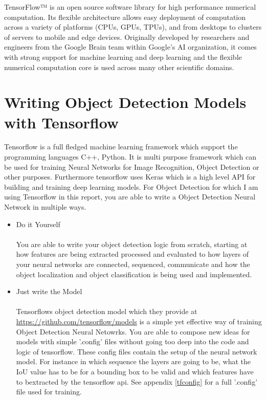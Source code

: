 
TensorFlow™ is an open source software library for high performance numerical computation. Its flexible architecture allows easy deployment
of computation across a variety of platforms (CPUs, GPUs, TPUs), and from desktops to clusters of servers to mobile and edge devices.
Originally developed by researchers and engineers from the Google Brain team within Google’s AI organization, it comes with strong support
for machine learning and deep learning and the flexible numerical computation core is used across many other scientific
domains.\cite{tensorflow}

\section{Writing Object Detection Models with Tensorflow} \label{train with tensorflow}
Tensorflow is a full fledged machine learning framework which support the programming languages C++, Python. It is multi purpose framework
which can be used for training Neural Networks for Image Recognition, Object Detection or other purposes. Furthermore tensorflow uses
Keras which is a high level API for building and training deep learning models. For Object Detection for which I am using Tensorflow in this
report, you are able to write a Object Detection Neural Network in multiple ways.
\begin{itemize}
    \item Do it Yourself \\ \\
        You are able to write your object detection logic from scratch, starting at how features are being extracted processed and
        evaluated to how layers of your neural networks are connected, sequenced, communicate and how the object localization and object
        classification is being used and implemented.
    \item Just write the Model \\ \\
        Tensorflows object detection model which they provide at \url{https://github.com/tensorflow/models} is a simple yet effective way of
        training Object Detection Neural Netowrks. You are able to compose new ideas for models with simple '.config' files without going
        too deep into the code and logic of tensorflow. These config files contain the setup of the neural network model. For instance in
        which sequence the layers are going to be, what the IoU value has to be for a bounding box to be valid and which features have to
        bextracted by the tensorflow api. See appendix \ref{tfconfig} for a full '.config' file used for training.
\end{itemize}


